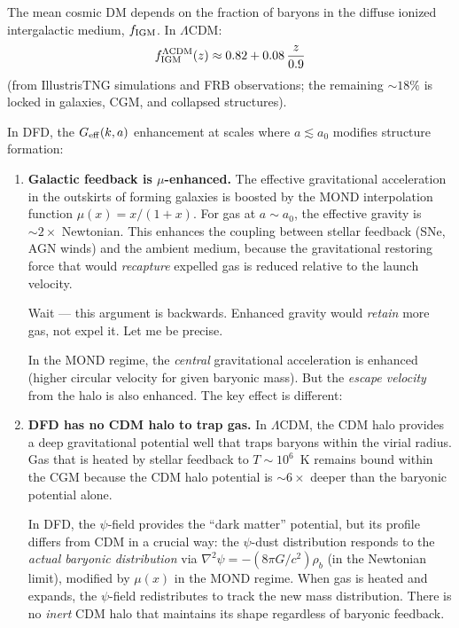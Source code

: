\documentclass[11pt]{article}
\newcommand{\LCDM}{$\Lambda$CDM}
\newcommand{\fIGM}{f_{\rm IGM}}
\newcommand{\Geff}{G_{\rm eff}}
\begin{document}
The mean cosmic DM depends on the fraction of baryons in the diffuse
ionized intergalactic medium, $\fIGM$.  In \LCDM:
\begin{equation}
\fIGM^{\rm \Lambda CDM}(z) \approx 0.82 + 0.08\,\frac{z}{0.9}
\label{eq:fIGM-LCDM}
\end{equation}
(from IllustrisTNG simulations and FRB observations; the remaining
$\sim 18\%$ is locked in galaxies, CGM, and collapsed structures).

In DFD, the $\Geff(k,a)$ enhancement at scales where $a \lesssim a_0$
modifies structure formation:
\begin{enumerate}
\item \textbf{Galactic feedback is $\mu$-enhanced.}  The effective
  gravitational acceleration in the outskirts of forming galaxies is
  boosted by the MOND interpolation function $\mu(x) = x/(1+x)$.
  For gas at $a \sim a_0$, the effective gravity is $\sim 2\times$
  Newtonian.  This enhances the coupling between stellar feedback
  (SNe, AGN winds) and the ambient medium, because the gravitational
  restoring force that would \emph{recapture} expelled gas is reduced
  relative to the launch velocity.

  Wait --- this argument is backwards.  Enhanced gravity would
  \emph{retain} more gas, not expel it.  Let me be precise.

  In the MOND regime, the \emph{central} gravitational acceleration
  is enhanced (higher circular velocity for given baryonic mass).
  But the \emph{escape velocity} from the halo is also enhanced.
  The key effect is different:

\item \textbf{DFD has no CDM halo to trap gas.}  In \LCDM, the CDM
  halo provides a deep gravitational potential well that traps baryons
  within the virial radius.  Gas that is heated by stellar feedback
  to $T \sim 10^6$~K remains bound within the CGM because the CDM
  halo potential is $\sim 6\times$ deeper than the baryonic potential
  alone.

  In DFD, the $\psi$-field provides the ``dark matter'' potential,
  but its profile differs from CDM in a crucial way: the $\psi$-dust
  distribution responds to the \emph{actual baryonic distribution}
  via $\nabla^2\psi = -(8\pi G/c^2)\rho_b$ (in the Newtonian limit),
  modified by $\mu(x)$ in the MOND regime.  When gas is heated and
  expands, the $\psi$-field redistributes to track the new mass
  distribution.  There is no \emph{inert} CDM halo that maintains
  its shape regardless of baryonic feedback.


\end{enumerate}
\end{document}

